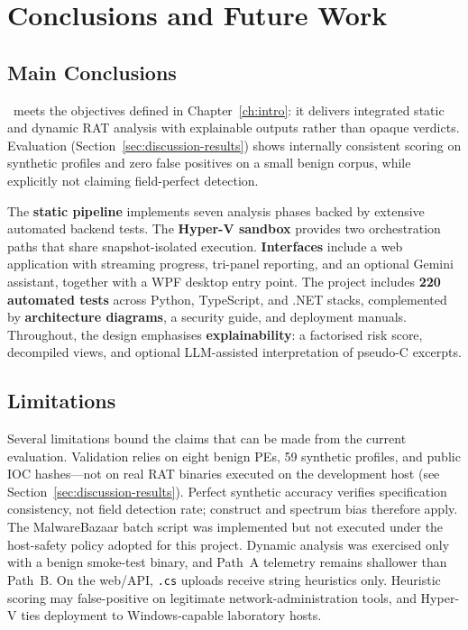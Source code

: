 \chapter{Conclusions and Future Work}
\label{ch:conclusoes}

\section{Main Conclusions}

\rat\ meets the objectives defined in Chapter~\ref{ch:intro}: it delivers integrated static and
dynamic RAT analysis with explainable outputs rather than opaque verdicts. Evaluation
(Section~\ref{sec:discussion-results}) shows internally consistent scoring on synthetic profiles and
zero false positives on a small benign corpus, while explicitly not claiming field-perfect
detection.

The \textbf{static pipeline} implements seven analysis phases backed by extensive automated backend
tests. The \textbf{Hyper-V sandbox} provides two orchestration paths that share snapshot-isolated
execution. \textbf{Interfaces} include a web application with streaming progress, tri-panel
reporting, and an optional Gemini assistant, together with a WPF desktop entry point. The project
includes \textbf{220 automated tests} across Python, TypeScript, and .NET stacks, complemented by
\textbf{architecture diagrams}, a security guide, and deployment manuals. Throughout, the design
emphasises \textbf{explainability}: a factorised risk score, decompiled views, and optional
LLM-assisted interpretation of pseudo-C excerpts.

\section{Limitations}

Several limitations bound the claims that can be made from the current evaluation. Validation
relies on eight benign PEs, 59 synthetic profiles, and public IOC hashes---not on real RAT binaries
executed on the development host (see Section~\ref{sec:discussion-results}). Perfect synthetic
accuracy verifies specification consistency, not field detection rate; construct and spectrum bias
therefore apply. The MalwareBazaar batch script was implemented but not executed under the
host-safety policy adopted for this project. Dynamic analysis was exercised only with a benign
smoke-test binary, and Path~A telemetry remains shallower than Path~B. On the web/API,
\texttt{.cs} uploads receive string heuristics only. Heuristic scoring may false-positive on
legitimate network-administration tools, and Hyper-V ties deployment to Windows-capable laboratory
hosts.

